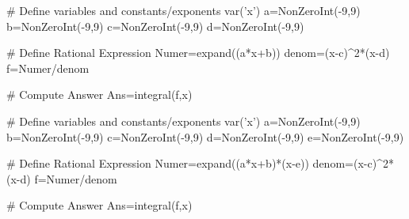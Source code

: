 


\begin{sagesilent}
# Define variables and constants/exponents
var('x')
a=NonZeroInt(-9,9)
b=NonZeroInt(-9,9)
c=NonZeroInt(-9,9)
d=NonZeroInt(-9,9)

# Define Rational Expression
Numer=expand((a*x+b))
denom=(x-c)^2*(x-d)
f=Numer/denom

# Compute Answer
Ans=integral(f,x)
\end{sagesilent}


\begin{sagesilent}
# Define variables and constants/exponents
var('x')
a=NonZeroInt(-9,9)
b=NonZeroInt(-9,9)
c=NonZeroInt(-9,9)
d=NonZeroInt(-9,9)
e=NonZeroInt(-9,9)

# Define Rational Expression
Numer=expand((a*x+b)*(x-e))
denom=(x-c)^2*(x-d)
f=Numer/denom

# Compute Answer
Ans=integral(f,x)
\end{sagesilent}



